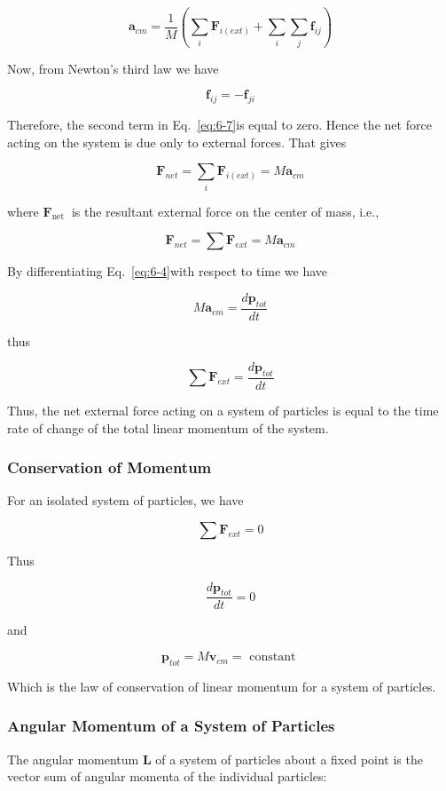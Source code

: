 \documentclass[10pt]{article}
\numberwithin{equation}{section}
\begin{document}
\begin{equation}
\mathbf{a}_{c m}=\frac{1}{M}\left(\sum_{i} \mathbf{F}_{i(e x t)}+\sum_{i} \sum_{j} \mathbf{f}_{i j}\right) \label{eq:6-7}
\end{equation}


Now, from Newton's third law we have

$$
\mathbf{f}_{i j}=-\mathbf{f}_{j i}
$$

Therefore, the second term in Eq.~\eqref{eq:6-7}is equal to zero. Hence the net force acting on the system is due only to external forces. That gives

$$
\mathbf{F}_{n e t}=\sum_{i} \mathbf{F}_{i(e x t)}=M \mathbf{a}_{c m}
$$

where $\mathbf{F}_{\text {net }}$ is the resultant external force on the center of mass, i.e.,

$$
\mathbf{F}_{n e t}=\sum \mathbf{F}_{e x t}=M \mathbf{a}_{c m}
$$

By differentiating Eq.~\eqref{eq:6-4}with respect to time we have

$$
M \mathbf{a}_{c m}=\frac{d \mathbf{p}_{t o t}}{d t}
$$

thus

$$
\sum \mathbf{F}_{e x t}=\frac{d \mathbf{p}_{t o t}}{d t}
$$

Thus, the net external force acting on a system of particles is equal to the time rate of change of the total linear momentum of the system.

\subsubsection{Conservation of Momentum}\label{sec:6-3-8}
For an isolated system of particles, we have

$$
\sum \mathbf{F}_{e x t}=0
$$

Thus

$$
\frac{d \mathbf{p}_{t o t}}{d t}=0
$$

and

$$
\mathbf{p}_{t o t}=M \mathbf{v}_{c m}=\text { constant }
$$

Which is the law of conservation of linear momentum for a system of particles.

\subsubsection{Angular Momentum of a System of Particles}\label{sec:6-3-9}
The angular momentum $\mathbf{L}$ of a system of particles about a fixed point is the vector sum of angular momenta of the individual particles:
\end{document}
